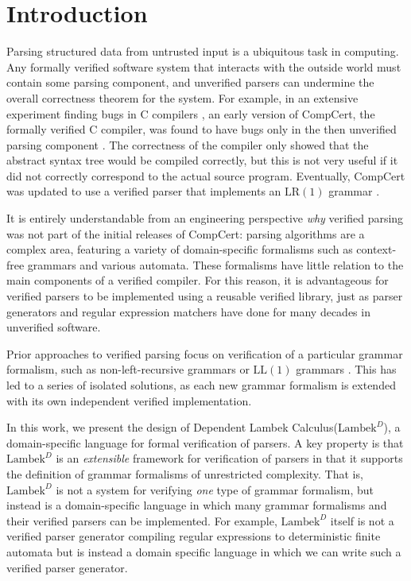 \documentclass[acmsmall,nonacm]{acmart}
\newcommand{\theoryname}{Dependent Lambek Calculus\xspace}
\newcommand{\theoryabbv}{$\textrm{Lambek}^D$\xspace}
\newcommand{\LLL}{\textrm{LL}}
\newcommand{\LRR}{\textrm{LR}}
\newcommand{\LL}[1]{\LLL(#1)}
\newcommand{\LR}[1]{\LRR(#1)}
\begin{document}
\section{Introduction}
\label{sec:intro}
Parsing structured data from untrusted input is a ubiquitous task in
computing. Any formally verified software system that interacts with the outside
world must contain some parsing component, and unverified parsers can undermine the overall correctness theorem for the system.
For example, in an extensive experiment finding bugs in C compilers
\cite{yangFindingUnderstandingBugs}, an early version of CompCert, the formally
verified C compiler, was found to have bugs only in the then
unverified parsing component \cite{leroy_formal_2009}.
The correctness of the compiler only showed that the abstract syntax tree would be compiled correctly, but this is
not very useful if it did not correctly correspond to the actual
source program. Eventually, CompCert
was updated to use a verified parser that implements
an $\LR{1}$ grammar
\cite{jourdanValidatingLRParsers2012}.

It is entirely understandable from an engineering perspective
\emph{why} verified parsing was not part of the initial releases of
CompCert: parsing algorithms are a complex area,
featuring a variety of domain-specific formalisms such as context-free
grammars and various automata. These formalisms have little relation
to the main components of a verified compiler. For this reason, it is
advantageous for verified parsers to be implemented using a reusable
verified library, just as parser generators and regular expression
matchers have done for many decades in unverified software.

Prior approaches to verified parsing focus on verification of a
particular grammar formalism, such as non-left-recursive grammars or
$\LL{1}$ grammars
\cite{lasserCoStarVerifiedALL2021,EdelmannZippy2020,danielssonTotalParserCombinators2010}.
This has led to a series of isolated solutions, as each new grammar formalism is extended with its own independent
verified implementation.

In this work, we present the design of \theoryname (\theoryabbv), a
domain-specific language for formal verification of parsers. A key
property is that \theoryabbv is an \emph{extensible} framework for
verification of parsers in that it supports the definition of grammar
formalisms of unrestricted complexity. That is, \theoryabbv is not a
system for verifying \emph{one} type of grammar formalism, but instead
is a domain-specific language in which many grammar formalisms and
their verified parsers can be implemented. For example, \theoryabbv itself is
not a verified parser generator compiling regular expressions to
deterministic finite automata but is instead a domain specific
language in which we can write such a verified parser generator.
\end{document}
